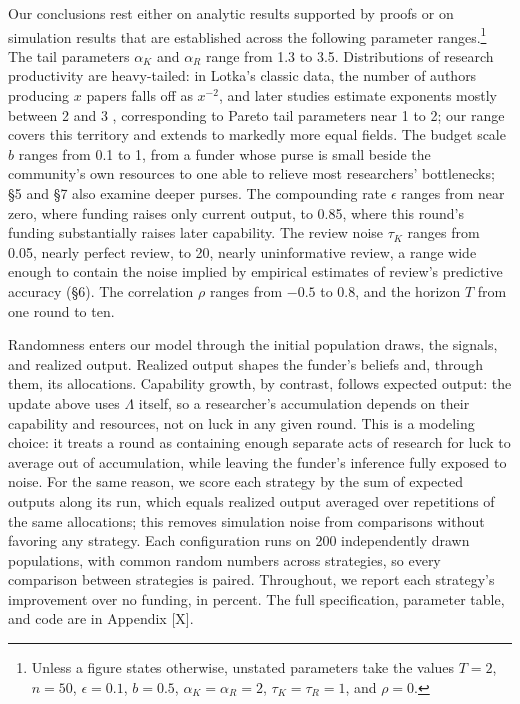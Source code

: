 \documentclass[article, 11pt, reqno]{amsart}
\theoremstyle{named}
\begin{document}
Our conclusions rest either on analytic results supported by proofs or on simulation
results that are established across the following parameter ranges.\footnote{Unless a figure
states otherwise, unstated parameters take the values $T = 2$, $n = 50$, $\epsilon = 0.1$,
$b = 0.5$, $\alpha_K = \alpha_R = 2$, $\tau_K = \tau_R = 1$, and $\rho = 0$.
} The tail parameters $\alpha_K$ and $\alpha_R$ range from 1.3 to 3.5. Distributions of
research productivity are heavy-tailed: in Lotka's classic data, the number of authors
producing $x$ papers falls off as $x^{-2}$, and later studies estimate exponents mostly
between 2 and 3 \citep{Lotka1926, Nicholls1989}, %
corresponding to Pareto tail parameters near 1 to 2; our range covers this territory and
extends to markedly more equal fields. The budget scale $b$ ranges from 0.1 to 1, from a
funder whose purse is small beside the community's own resources to one able to relieve
most researchers' bottlenecks; \S5 and \S7 also examine deeper purses. The compounding
rate $\epsilon$ ranges from near zero, where funding raises only current output, to 0.85,
where this round's funding substantially raises later capability. The review noise
$\tau_K$ ranges from 0.05, nearly perfect review, to 20, nearly uninformative review, a
range wide enough to contain the noise implied by empirical estimates of review's
predictive accuracy (\S6). The correlation $\rho$ ranges from $-0.5$ to 0.8, and the
horizon $T$ from one round to ten.

Randomness enters our model through the initial population draws, the signals, and
realized output. Realized output shapes the funder's beliefs and, through them, its
allocations. Capability growth, by contrast, follows expected output: the update above
uses $\Lambda$ itself, so a researcher's accumulation depends on their capability and
resources, not on luck in any given round. This is a modeling choice: it treats a round as
containing enough separate acts of research for luck to average out of accumulation, while
leaving the funder's inference fully exposed to noise. For the same reason, we score each
strategy by the sum of expected outputs along its run, which equals realized output
averaged over repetitions of the same allocations; this removes simulation noise from
comparisons without favoring any strategy. Each configuration runs on 200 independently
drawn populations, with common random numbers across strategies, so every comparison
between strategies is paired. Throughout, we report each strategy's improvement over no
funding, in percent. The full specification, parameter table, and code are in Appendix
[X]. %
\end{document}
